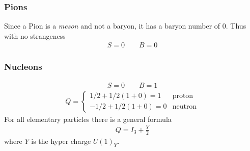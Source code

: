 \documentclass[../main.tex]{subfiles}
\begin{document}
\subsubsection*{Pions}
Since a Pion is a \emph{meson} and not a baryon, it has a baryon number of 0. Thus with no
strangeness
\begin{align*}
    S = 0 \qquad B = 0
\end{align*}
\subsubsection*{Nucleons}
\begin{align*}
    S = 0 \qquad B = 1
\end{align*}
\begin{align*}
    Q = \begin{cases}
        1/2 + 1/2(1 + 0)= 1 & \textrm{proton} \\
        -1/2 + 1/2(1 + 0)= 0 & \textrm{neutron}
    \end{cases}
\end{align*}
For all elementary particles there is a general formula
\begin{align*}
    Q = I_3 + \frac{Y}{2}
\end{align*}
where $Y$ is the hyper charge $U(1)_Y$.
\end{document}
